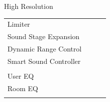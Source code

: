 \documentclass{beamer}
\begin{document}
\begin{frame}[t]{High Resolution}
\begin{tiny}
\begin{tabular}{@{}lccc@{}}
				Limiter & \color{black}{Off} & & \\
				Sound Stage Expansion & \color{black}{Off} & & \\
				Dynamic Range Control & \color{black}{Off} & & \\
				Smart Sound Controller & \color{black}{Off} & & \\
				\color{blue}{High Resolution} & \color{blue}{On} & & \\
				User EQ & \color{black}{Off} & & \\
				Room EQ & \color{black}{Off} & & \\
				\color{blue}{OSD Volume} & \color{blue}{On} &  \color{blue}{Vol.40} & \\
				\midrule
			\end{tabular}
		\end{tiny}
		
	\end{frame}
	
\end{document}
